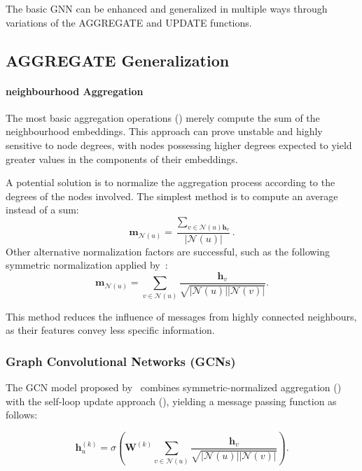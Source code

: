 The basic GNN can be enhanced and generalized in multiple ways through variations of the AGGREGATE and UPDATE functions.

\subsection{AGGREGATE Generalization}
\paragraph{neighbourhood Aggregation}
The most basic aggregation operations () merely compute the sum of the neighbourhood embeddings. This approach can prove unstable and highly sensitive to node degrees, with nodes possessing higher degrees expected to yield greater values in the components of their embeddings.

A potential solution is to normalize the aggregation process according to the degrees of the nodes involved. The simplest method is to compute an average instead of a sum:
\begin{equation*}
    \mathbf{m}_{\mathcal{N}(u)} = \frac{\sum_{v \in \mathcal{N}(u) \mathbf{h}_v}}{|\mathcal{N}(u)|}.
\end{equation*}
Other alternative normalization factors are successful, such as the following symmetric normalization applied by~\cite{kipf2016semi}:
\begin{equation}\label{eq:symmetricNormalization}
    \mathbf{m}_{\mathcal{N}(u)} = \sum_{v \in \mathcal{N}(u)}\frac{ \mathbf{h}_v}{\sqrt{|\mathcal{N}(u)||\mathcal{N}(v)|}}.
\end{equation}

This method reduces the influence of messages from highly connected neighbours, as their features convey less specific information.

\subsubsection{Graph Convolutional Networks (GCNs)}
The GCN model proposed by~\cite{kipf2016semi} combines symmetric-normalized aggregation () with the self-loop update approach (), yielding a message passing function as follows:

\begin{equation*}
    \mathbf{h}_u^{(k)} = \sigma\left(\mathbf{W}^{(k)}\sum_{v \in \mathcal{N}(u)}\frac{ \mathbf{h}_v}{\sqrt{|\mathcal{N}(u)||\mathcal{N}(v)|}}\right).
\end{equation*}

